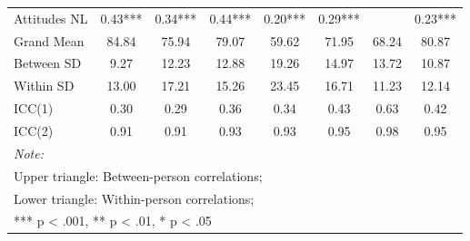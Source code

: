 \begin{table}
\begin{minipage}[t][\textheight][t]{\textwidth}
{\begin{tabular}[t]{lccccccc}
\hspace{1em}Attitudes NL & 0.43*** & 0.34*** & 0.44*** & 0.20*** & 0.29*** &  & 0.23***\\
\addlinespace
\hspace{1em}Grand Mean & 84.84 & 75.94 & 79.07 & 59.62 & 71.95 & 68.24 & 80.87\\
\hspace{1em}Between SD & 9.27 & 12.23 & 12.88 & 19.26 & 14.97 & 13.72 & 10.87\\
\hspace{1em}Within SD & 13.00 & 17.21 & 15.26 & 23.45 & 16.71 & 11.23 & 12.14\\
\hspace{1em}ICC(1) & 0.30 & 0.29 & 0.36 & 0.34 & 0.43 & 0.63 & 0.42\\
\hspace{1em}ICC(2) & 0.91 & 0.91 & 0.93 & 0.93 & 0.95 & 0.98 & 0.95\\
\bottomrule
\multicolumn{8}{l}{\rule{0pt}{1em}\textit{Note: }}\\
\multicolumn{8}{l}{\rule{0pt}{1em}Upper triangle: Between-person correlations;}\\
\multicolumn{8}{l}{\rule{0pt}{1em}Lower triangle: Within-person correlations;}\\
\multicolumn{8}{l}{\rule{0pt}{1em}*** p < .001, ** p < .01,  * p < .05}\\
\end{tabular}}
\end{minipage}
\end{table}
